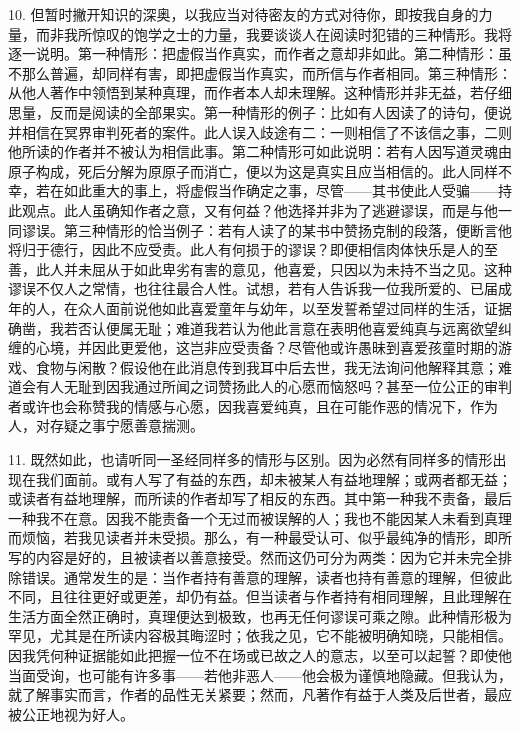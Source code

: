 10. 但暂时撇开知识的深奥，以我应当对待密友的方式对待你，即按我自身的力量，而非我所惊叹的饱学之士的力量，我要谈谈人在阅读时犯错的三种情形。我将逐一说明。第一种情形：把虚假当作真实，而作者之意却非如此。第二种情形：虽不那么普遍，却同样有害，即把虚假当作真实，而所信与作者相同。第三种情形：从他人著作中领悟到某种真理，而作者本人却未理解。这种情形并非无益，若仔细思量，反而是阅读的全部果实。第一种情形的例子：比如有人因读了的诗句，便说并相信在冥界审判死者的案件。此人误入歧途有二：一则相信了不该信之事，二则他所读的作者并不被认为相信此事。第二种情形可如此说明：若有人因写道灵魂由原子构成，死后分解为原原子而消亡，便以为这是真实且应当相信的。此人同样不幸，若在如此重大的事上，将虚假当作确定之事，尽管——其书使此人受骗——持此观点。此人虽确知作者之意，又有何益？他选择并非为了逃避谬误，而是与他一同谬误。第三种情形的恰当例子：若有人读了的某书中赞扬克制的段落，便断言他将归于德行，因此不应受责。此人有何损于的谬误？即便相信肉体快乐是人的至善，此人并未屈从于如此卑劣有害的意见，他喜爱，只因以为未持不当之见。这种谬误不仅人之常情，也往往最合人性。试想，若有人告诉我一位我所爱的、已届成年的人，在众人面前说他如此喜爱童年与幼年，以至发誓希望过同样的生活，证据确凿，我若否认便属无耻；难道我若认为他此言意在表明他喜爱纯真与远离欲望纠缠的心境，并因此更爱他，这岂非应受责备？尽管他或许愚昧到喜爱孩童时期的游戏、食物与闲散？假设他在此消息传到我耳中后去世，我无法询问他解释其意；难道会有人无耻到因我通过所闻之词赞扬此人的心愿而恼怒吗？甚至一位公正的审判者或许也会称赞我的情感与心愿，因我喜爱纯真，且在可能作恶的情况下，作为人，对存疑之事宁愿善意揣测。\par

11. 既然如此，也请听同一圣经同样多的情形与区别。因为必然有同样多的情形出现在我们面前。或有人写了有益的东西，却未被某人有益地理解；或两者都无益；或读者有益地理解，而所读的作者却写了相反的东西。其中第一种我不责备，最后一种我不在意。因我不能责备一个无过而被误解的人；我也不能因某人未看到真理而烦恼，若我见读者并未受损。那么，有一种最受认可、似乎最纯净的情形，即所写的内容是好的，且被读者以善意接受。然而这仍可分为两类：因为它并未完全排除错误。通常发生的是：当作者持有善意的理解，读者也持有善意的理解，但彼此不同，且往往更好或更差，却仍有益。但当读者与作者持有相同理解，且此理解在生活方面全然正确时，真理便达到极致，也再无任何谬误可乘之隙。此种情形极为罕见，尤其是在所读内容极其晦涩时；依我之见，它不能被明确知晓，只能相信。因我凭何种证据能如此把握一位不在场或已故之人的意志，以至可以起誓？即使他当面受询，也可能有许多事——若他非恶人——他会极为谨慎地隐藏。但我认为，就了解事实而言，作者的品性无关紧要；然而，凡著作有益于人类及后世者，最应被公正地视为好人。\par

